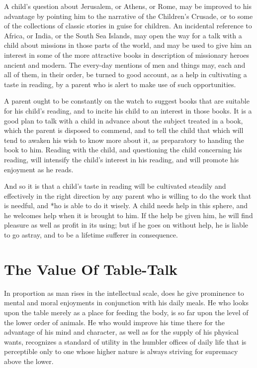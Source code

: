 \documentclass[
]{book}
\begin{document}
A child's question about Jerusalem, or Athens, or Rome, may be improved to his advantage by pointing him to the narrative of the Children's Crusade, or to some of the collections of classic stories in guise for children. An incidental reference to Africa, or India, or the South Sea Islands, may open the way for a talk with a child about missions in those parts of the world, and may be used to give him an interest in some of the more attractive books in description of missionary heroes ancient and modern. The every-day mentions of men and things may, each and all of them, in their order, be turned to good account, as a help in cultivating a taste in reading, by a parent who is alert to make use of such opportunities.

A parent ought to be constantly on the watch to suggest books that are suitable for his child's reading, and to incite his child to an interest in those books. It is a good plan to talk with a child in advance about the subject treated in a book, which the parent is disposed to commend, and to tell the child that which will tend to awaken his wish to know more about it, as preparatory to handing the book to him. Reading with the child, and questioning the child concerning his reading, will intensify the child's interest in his reading, and will promote his enjoyment as he reads.

And so it is that a child's taste in reading will be cultivated steadily and effectively in the right direction by any parent who is willing to do the work that is needful, and *ho is able to do it wisely. A child needs help in this sphere, and he welcomes help when it is brought to him. If the help be given him, he will find pleasure as well as profit in its using; but if he goes on without help, he is liable to go astray, and to be a lifetime sufferer in consequence.

\hypertarget{the-value-of-table-talk}{%
\chapter{The Value Of Table-Talk}\label{the-value-of-table-talk}}

In proportion as man rises in the intellectual scale, does he give prominence to mental and moral enjoyments in conjunction with his daily meals. He who looks upon the table merely as a place for feeding the body, is so far upon the level of the lower order of animals. He who would improve his time there for the advantage of his mind and character, as well as for the supply of his physical wants, recognizes a standard of utility in the humbler offices of daily life that is perceptible only to one whose higher nature is always striving for supremacy above the lower.
\end{document}
